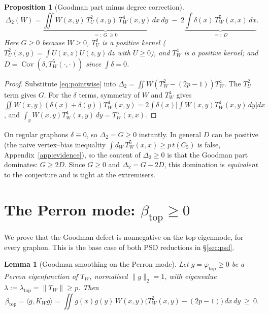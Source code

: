 \documentclass[11pt]{article}
\newtheorem{proposition}[theorem]{Proposition}
\newtheorem{lemma}[theorem]{Lemma}
\theoremstyle{definition}
\newcommand{\Cov}{\operatorname{Cov}}
\newcommand{\tw}{T_W}
\newcommand{\tu}{T_U}
\newcommand{\kw}{K_W}
\begin{document}
\begin{proposition}[Goodman part minus degree correction]\label{prop:GD}
\begin{equation}\label{eq:GD}
  \Delta_2(W)=\underbrace{\iint W(x,y)\,\tu^2(x,y)\,\tw^4(x,y)\,dx\,dy}_{=:~G~\ge0}
  \;-\;2\underbrace{\int\delta(x)\,\tw^5(x,x)\,dx}_{=:~D}.
\end{equation}
Here $G\ge0$ because $W\ge0$, $\tu^2$ is a positive kernel
($\tu^2(x,y)=\int U(x,z)U(z,y)\,dz$ with $U\ge0$), and $\tw^4$ is a positive
kernel; and $D=\Cov(\delta,\tw^5(\cdot,\cdot))$ since $\int\delta=0$.
\end{proposition}

\begin{proof}
Substitute \eqref{eq:pointwise} into
$\Delta_2=\iint W(\tw^2-(2p-1))\tw^4$.  The $\tu^2$ term gives $G$.  For the
$\delta$ terms, symmetry of $W$ and $\tw^4$ gives
$\iint W(x,y)(\delta(x)+\delta(y))\tw^4(x,y)=2\int\delta(x)\big[\int
W(x,y)\tw^4(x,y)\,dy\big]dx$, and $\int_y W(x,y)\tw^4(x,y)\,dy=\tw^5(x,x)$.
\end{proof}

On regular graphons $\delta\equiv0$, so $\Delta_2=G\ge0$ instantly.  In general
$D$ can be positive (the naive vertex--bias inequality $\int d_W\,\tw^5(x,x)\ge
p\,t(C_5)$ is false, Appendix~\ref{app:evidence}), so the content of
$\Delta_2\ge0$ is that the Goodman part dominates: $G\ge2D$.  Since $G\ge0$ and
$\Delta_2=G-2D$, this domination is \emph{equivalent} to the conjecture and is
tight at the extremisers.

\section{The Perron mode: $\beta_{\mathrm{top}}\ge0$}\label{sec:betatop}

We prove that the Goodman defect is nonnegative on the top eigenmode, for every
graphon.  This is the base case of both PSD reductions in \S\ref{sec:psd}.

\begin{lemma}[Goodman smoothing on the Perron mode]\label{lem:betatop}
Let $g=\varphi_{\mathrm{top}}\ge0$ be a Perron eigenfunction of $\tw$, normalised
$\|g\|_2=1$, with eigenvalue $\lambda:=\lambda_{\mathrm{top}}=\|\tw\|\ge p$.  Then
\[
  \beta_{\mathrm{top}}=\langle g,\kw g\rangle
  =\iint g(x)g(y)\,W(x,y)\big(\tw^2(x,y)-(2p-1)\big)\,dx\,dy\ \ge\ 0 .
\]
\end{lemma}
\end{document}
